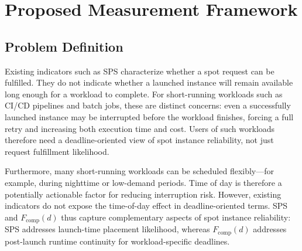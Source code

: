 \documentclass[runningheads]{llncs}
\begin{document}

\section{Proposed Measurement Framework}

\subsection{Problem Definition}

Existing indicators such as SPS characterize whether a spot request can be fulfilled. They do not indicate whether a launched instance will remain available long enough for a workload to complete. For short-running workloads such as CI/CD pipelines and batch jobs, these are distinct concerns: even a successfully launched instance may be interrupted before the workload finishes, forcing a full retry and increasing both execution time and cost. Users of such workloads therefore need a deadline-oriented view of spot instance reliability, not just request fulfillment likelihood.

Furthermore, many short-running workloads can be scheduled flexibly—for example, during nighttime or low-demand periods. Time of day is therefore a potentially actionable factor for reducing interruption risk. However, existing indicators do not expose the time-of-day effect in deadline-oriented terms. SPS and $F_{\mathrm{comp}}(d)$ thus capture complementary aspects of spot instance reliability: SPS addresses launch-time placement likelihood, whereas $F_{\mathrm{comp}}(d)$ addresses post-launch runtime continuity for workload-specific deadlines.
\end{document}
